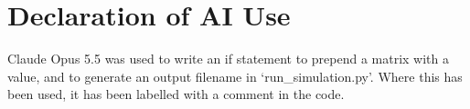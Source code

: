 \section*{Declaration of AI Use}
Claude Opus 5.5 was used to write an if statement to prepend a matrix with a value, and to generate an output filename in `run\_simulation.py'. Where this has been used, it has been labelled with a comment in the code.